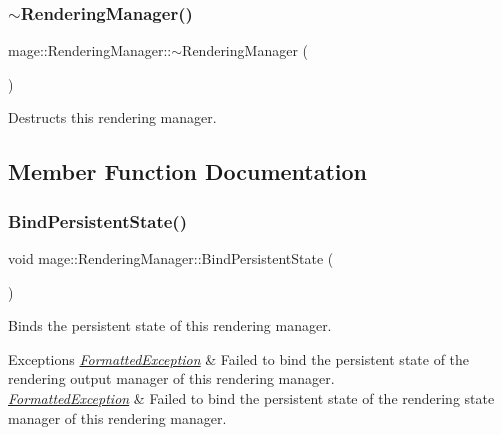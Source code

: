 \subsubsection{\texorpdfstring{$\sim$\+Rendering\+Manager()}{~RenderingManager()}}
{\footnotesize\ttfamily mage\+::\+Rendering\+Manager\+::$\sim$\+Rendering\+Manager (\begin{DoxyParamCaption}{ }\end{DoxyParamCaption})}

Destructs this rendering manager. 

\subsection{Member Function Documentation}
\hypertarget{classmage_1_1_rendering_manager_adadab213b9aabdc6167a012d340084a6}{}\label{classmage_1_1_rendering_manager_adadab213b9aabdc6167a012d340084a6} 
\subsubsection{\texorpdfstring{Bind\+Persistent\+State()}{BindPersistentState()}}
{\footnotesize\ttfamily void mage\+::\+Rendering\+Manager\+::\+Bind\+Persistent\+State (\begin{DoxyParamCaption}{ }\end{DoxyParamCaption})}

Binds the persistent state of this rendering manager.


\begin{DoxyExceptions}{Exceptions}
{\em \hyperlink{structmage_1_1_formatted_exception}{Formatted\+Exception}} & Failed to bind the persistent state of the rendering output manager of this rendering manager. \\
\hline
{\em \hyperlink{structmage_1_1_formatted_exception}{Formatted\+Exception}} & Failed to bind the persistent state of the rendering state manager of this rendering manager. \\
\hline
\end{DoxyExceptions}
\hypertarget{classmage_1_1_rendering_manager_a920fdd741d160b687ecac1d892f8bfd1}{}\label{classmage_1_1_rendering_manager_a920fdd741d160b687ecac1d892f8bfd1} 
